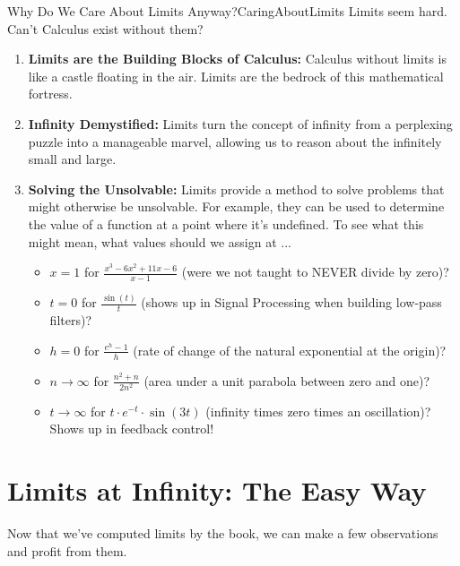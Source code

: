 \begin{funColor}{Why Do We Care About Limits Anyway?}{CaringAboutLimits}
Limits seem hard. Can't Calculus exist without them? 

\begin{enumerate}
\item \textbf{Limits are the Building Blocks of Calculus:}  Calculus without limits is like a castle floating in the air. Limits are the bedrock of this mathematical fortress.
\item \textbf{Infinity Demystified:} Limits turn the concept of infinity from a perplexing puzzle into a manageable marvel, allowing us to reason about the infinitely small and large.
\item \textbf{Solving the Unsolvable:} Limits provide a method to solve problems that might otherwise be unsolvable. For example, they can be used to determine the value of a function at a point where it's undefined. To see what this might mean, what values should we assign at ...
\begin{itemize}
\item $x=1$ for $\frac{x^3 - 6x^2 + 11x - 6}{x-1}$ (were we not taught to NEVER divide by zero)?
\item $t=0$ for $\frac{\sin(t)}{t}$ (shows up in Signal Processing when building low-pass filters)?
\item $h=0$ for $\frac{e^h-1}{h}$ (rate of change of the natural exponential at the origin)?
\item $n \to \infty$ for $\frac{n^2 + n}{2n^2}$ (area under a unit parabola between zero and one)?
\item $t \to \infty$ for $t \cdot e^{-t} \cdot \sin(3t)$ (infinity times zero times an oscillation)? Shows up in feedback control!
\end{itemize}

\end{enumerate}
    
\end{funColor}

\section{Limits at Infinity: The Easy Way}
\label{sec:LimitInfinityEasy}

Now that we've computed limits by the book, we can make a few observations and profit from them. 

